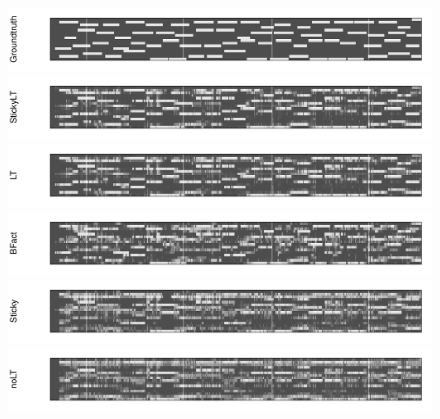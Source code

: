 \begin{figure}[tb]
\begin{center}
  \centerline{\includegraphics[width = \textwidth, height = 0.2\textwidth]{fig/cocktail/SSC1_s16_m12/abs_2000_n0.3_cp0/all_models/groundtruth.pdf}}
  \centerline{\includegraphics[width = \textwidth, height = 0.2\textwidth]{fig/cocktail/SSC1_s16_m12/abs_2000_n0.3_cp0/all_models/StickyLT_hdp_hmm_w0/binary_state.pdf}}
  \centerline{\includegraphics[width = \textwidth, height = 0.2\textwidth]{fig/cocktail/SSC1_s16_m12/abs_2000_n0.3_cp0/all_models/LT_hdp_hmm_w0/binary_state.pdf}}
  \centerline{\includegraphics[width = \textwidth, height = 0.2\textwidth]{fig/cocktail/SSC1_s16_m12/abs_2000_n0.3_cp0/all_models/BFact_hmm_w0/binary_state.pdf}}
  \centerline{\includegraphics[width = \textwidth, height = 0.2\textwidth]{fig/cocktail/SSC1_s16_m12/abs_2000_n0.3_cp0/all_models/Sticky_hdp_hmm_w0/binary_state.pdf}}
  \centerline{\includegraphics[width = \textwidth, height = 0.2\textwidth]{fig/cocktail/SSC1_s16_m12/abs_2000_n0.3_cp0/all_models/noLT_hdp_hmm_w0/binary_state.pdf}}

\end{center}
\end{figure}
